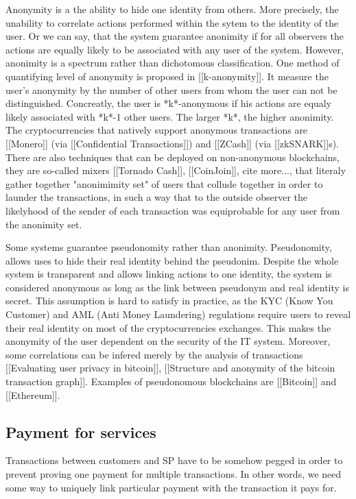 \documentclass{article}
\begin{document}
Anonymity is a the ability to hide one identity from others. More precisely, the unability to correlate actions performed within the sytem to the identity of the user. Or we can say, that the system guarantee anonimity if for all observers the actions are equally likely to be associated with any user of the system.
However, anonimity is a spectrum rather than dichotomous classification. One method of quantifying level of anonymity is proposed in [[k-anonymity]]. It measure the user's anonymity by the number of other users from whom the user can not be distinguished. Concreatly, the user is *k*-anonymous if his actions are equaly likely associated with *k*-1 other users. The larger *k*, the higher anonimity. The cryptocurrencies that natively support anonymous transactions are [[Monero]] (via [[Confidential Transactions]]) and [[ZCash]] (via [[zkSNARK]]s). There are also techniques that can be deployed on non-anonymous blockchains, they are so-called mixers [[Tornado Cash]], [[CoinJoin]], cite more..., that literaly gather together "anonimimity set" of users that collude together in order to launder the transactions, in such a way that to the outside observer the likelyhood of the sender of each transaction was equiprobable for any user from the anonimity set.

Some systems guarantee pseudonomity rather than anonimity. Pseudonomity, allows uses to hide their real identity behind the pseudonim. Despite the whole system is transparent and allows linking actions to one identity, the system is considered anonymous as long as the link between pseudonym and real identity is secret. This assumption is hard to satisfy in practice, as the KYC (Know You Customer) and AML (Anti Money Laundering) regulations require users to reveal their real identity on most of the cryptocurrencies exchanges. This makes the anonymity of the user dependent on the security of the IT system. Moreover, some correlations can be infered merely by the analysis of transactions [[Evaluating user privacy in bitcoin]], [[Structure and anonymity of the bitcoin transaction graph]]. Examples of pseudonomous blockchains are [[Bitcoin]] and [[Ethereum]].


\subsection{Payment for services}
Transactions between customers and SP have to be somehow pegged in order to prevent proving one payment for multiple transactions. In other words, we need some way to uniquely link particular payment with the transaction it pays for. 
\end{document}
